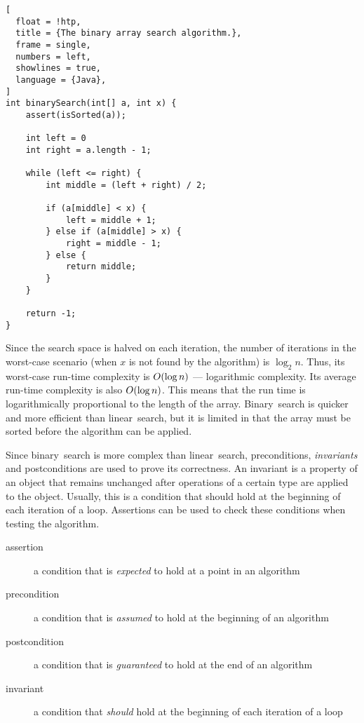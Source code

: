 \begin{lstlisting}[
  float = !htp,
  title = {The binary array search algorithm.},
  frame = single,
  numbers = left,
  showlines = true,
  language = {Java},
]
int binarySearch(int[] a, int x) {
    assert(isSorted(a));

    int left = 0
    int right = a.length - 1;

    while (left <= right) {
        int middle = (left + right) / 2;

        if (a[middle] < x) {
            left = middle + 1;
        } else if (a[middle] > x) {
            right = middle - 1;
        } else {
            return middle;
        }
    }

    return -1;
}
\end{lstlisting}

Since the search space is halved on each iteration, the number of iterations in the worst-case scenario (when \( x \) is not found by the algorithm) is \( \log_{2} n \).
Thus, its worst-case run-time complexity is \( O\!\left(\log n\right) \) --- logarithmic complexity.
Its average run-time complexity is also \( O\!\left(\log n\right) \).
This means that the run time is logarithmically proportional to the length of the array.
Binary~search is quicker and more efficient than linear~search, but it is limited in that the array must be sorted before the algorithm can be applied.

Since binary~search is more complex than linear~search, preconditions, \emph{invariants} and postconditions are used to prove its correctness.
An invariant is a property of an object that remains unchanged after operations of a certain type are applied to the object.
Usually, this is a condition that should hold at the beginning of each iteration of a loop.
Assertions can be used to check these conditions when testing the algorithm.

\begin{description}
  \item[assertion] a condition that is \emph{expected} to hold at a point in an algorithm
  \item[precondition] a condition that is \emph{assumed} to hold at the beginning of an algorithm
  \item[postcondition] a condition that is \emph{guaranteed} to hold at the end of an algorithm
  \item[invariant] a condition that \emph{should} hold at the beginning of each iteration of a loop
\end{description}
